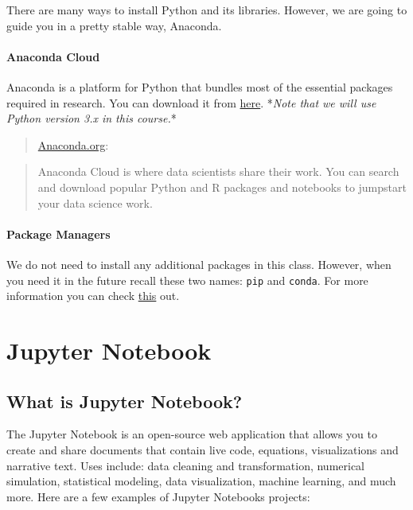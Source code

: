 \documentclass[11pt]{article}
\begin{document}
There are many ways to install Python and its libraries. However, we are
going to guide you in a pretty stable way, Anaconda.

\hypertarget{anaconda-cloud}{%
\paragraph{Anaconda Cloud}\label{anaconda-cloud}}

Anaconda is a platform for Python that bundles most of the essential
packages required in research. You can download it from
\href{https://www.anaconda.com/download/}{here}. *\emph{Note that we
will use Python version 3.x in this course.}*

\begin{quote}
\href{https://anaconda.org/}{Anaconda.org}:
\end{quote}

\begin{quote}
Anaconda Cloud is where data scientists share their work. You can search
and download popular Python and R packages and notebooks to jumpstart
your data science work.
\end{quote}

\hypertarget{package-managers}{%
\paragraph{Package Managers}\label{package-managers}}

We do not need to install any additional packages in this class.
However, when you need it in the future recall these two names:
\texttt{pip} and \texttt{conda}. For more information you can check
\href{https://conda.io/docs/user-guide/tasks/manage-pkgs.html\#installing-packages}{this}
out.

\hypertarget{jupyter-notebook}{%
\section{Jupyter Notebook}\label{jupyter-notebook}}

\hypertarget{what-is-jupyter-notebook}{%
\subsection{What is Jupyter Notebook?}\label{what-is-jupyter-notebook}}

The Jupyter Notebook is an open-source web application that allows you
to create and share documents that contain live code, equations,
visualizations and narrative text. Uses include: data cleaning and
transformation, numerical simulation, statistical modeling, data
visualization, machine learning, and much more. Here are a few examples
of Jupyter Notebooks projects:
\end{document}
